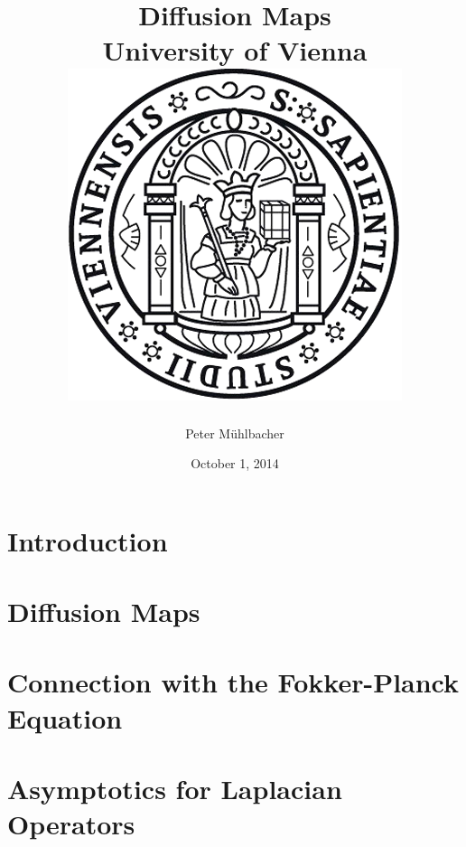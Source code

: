\documentclass[11pt]{report}
\begin{document}
\title{
	{Diffusion Maps}\\
	{\large University of Vienna}\\
	{\includegraphics{university.png}}
}
\author{Peter Mühlbacher}
\date{October 1, 2014}
\maketitle

\begin{abstract}
\end{abstract}

\tableofcontents

\chapter*{Introduction}


\chapter{Diffusion Maps}


\chapter{Connection with the Fokker-Planck Equation}


%

\appendix
\chapter{Asymptotics for Laplacian Operators}

%



\end{document}
